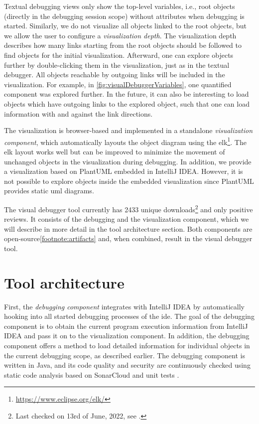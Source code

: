 \documentclass[conference]{IEEEtran}
\newcommand{\intellij}{IntelliJ IDEA}
\begin{document}
Textual debugging views only show the top-level variables, i.e., root objects (directly in the debugging session scope) without attributes when debugging is started.
Similarly, we do not visualize all objects linked to the root objects, but we allow the user to configure a \textit{visualization depth}.
The visualization depth describes how many links starting from the root objects should be followed to find objects for the initial visualization.
Afterward, one can explore objects further by double-clicking them in the visualization, just as in the textual debugger.
All objects reachable by outgoing links will be included in the visualization.
For example, in \cref{fig:visualDebuggerVariables}, one quantified component was explored further.
In the future, it can also be interesting to load objects which have outgoing links to the explored object, such that one can load information with and against the link directions.

The visualization is browser-based and implemented in a standalone \textit{visualization component}, which automatically layouts the object diagram using the \gls*{elk}\footnote{\url{https://www.eclipse.org/elk/}}.
The \gls*{elk} layout works well but can be improved to minimize the movement of unchanged objects in the visualization during debugging.
In addition, we provide a visualization based on PlantUML embedded in \intellij{}.
However, it is not possible to explore objects inside the embedded visualization since PlantUML provides static \gls*{uml} diagrams.

The visual debugger tool currently has 2433 unique downloads\footnote{\label{footnote:pluginStats}Last checked on 13rd of June, 2022, see \cite{VisualDebuggerIntelliJ}.} and only positive reviews.
It consists of the debugging and the visualization component, which we will describe in more detail in the tool architecture section.
Both components are open-source\cref{footnote:artifacts} and, when combined, result in the visual debugger tool.

\section{Tool architecture}  \label{sec:architecture}
First, the \textit{debugging component} integrates with \intellij{} by automatically hooking into all started debugging processes of the \gls*{ide}.
The goal of the debugging component is to obtain the current program execution information from \intellij{} and pass it on to the visualization component.
In addition, the debugging component offers a method to load detailed information for individual objects in the current debugging scope, as described earlier.
The debugging component is written in Java, and its code quality and security are continuously checked using static code analysis based on SonarCloud and unit tests \cite{ArtifactsICSME2022}.
\end{document}
